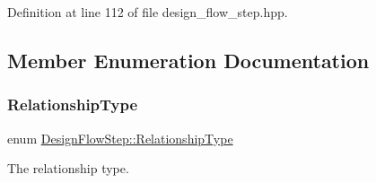 Definition at line 112 of file design\+\_\+flow\+\_\+step.\+hpp.



\subsection{Member Enumeration Documentation}
\mbox{\label{classDesignFlowStep_a723a3baf19ff2ceb77bc13e099d0b1b7}} 
\subsubsection{\texorpdfstring{Relationship\+Type}{RelationshipType}}
{\footnotesize\ttfamily enum \hyperlink{classDesignFlowStep_a723a3baf19ff2ceb77bc13e099d0b1b7}{Design\+Flow\+Step\+::\+Relationship\+Type}}



The relationship type. 

